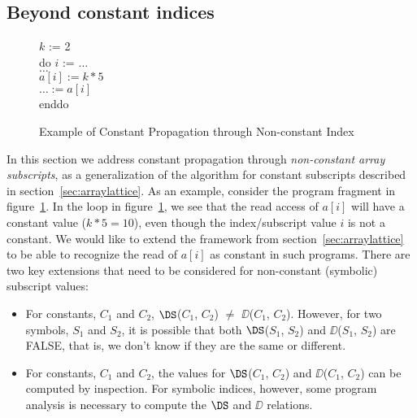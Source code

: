 \subsection{Beyond constant indices}
\label{sec:non-const}
\begin{figure}
\begin{center}
\parbox{3.0in}{
\begin{programa}
\Ta $k$ := 2 \\
\Ta do $i$ := $\ldots$ \\
\Tb  $\ldots$ \\
\Tb  $a[i] := k * 5$ \\
\Tb  $\ldots := a[i]$ \\
\Ta enddo \\
\end{programa}
}
\end{center}
\caption{Example of Constant Propagation through Non-constant Index}
\label{fig:non-const-ex-source}
\end{figure}

In this section we address constant propagation
through {\it non-constant array subscripts}, as a generalization
of the algorithm
for constant subscripts described in section~\ref{sec:arraylattice}.
As an example, consider the program fragment in
figure~\ref{fig:non-const-ex-source}.  In the loop in
figure~\ref{fig:non-const-ex-source}, we see that the read access of
$a[i]$ will have a constant value ($k*5=10$), even though the
index/subscript value $i$ is not a constant.  We would like to extend
the framework from section~\ref{sec:arraylattice}  to be
able to recognize the read of $a[i]$ as constant in such programs.
There are two key extensions that need to be considered
for non-constant (symbolic) subscript values:
\begin{itemize}

\item  For constants, $C_1$ and $C_2$, $\DS$($C_1$, $C_2$) $\neq$ 
$\DD$($C_1$, $C_2$). However, for two symbols,  $S_1$ and $S_2$,
it is possible that both $\DS$($S_1$, $S_2$) and $\DD$($S_1$,
$S_2$) are FALSE, that is, we don't know if they are the same or different.

\item For constants, $C_1$ and $C_2$, the values for $\DS$($C_1$, $C_2$) and 
$\DD$($C_1$, $C_2$) can be computed by inspection. For symbolic
indices, however, some program analysis is necessary
to compute the $\DS$ and $\DD$ relations.
\end{itemize} 


